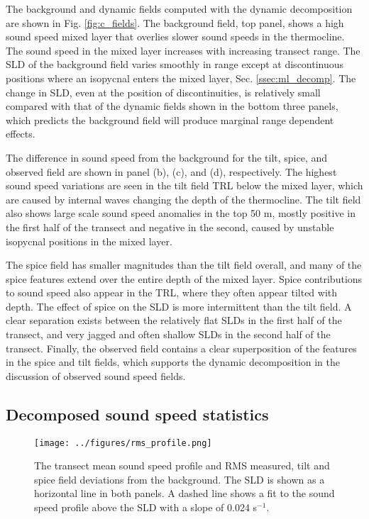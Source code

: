 \documentclass[preprint,NumberedRefs]{JASA}
\begin{document}
The background and dynamic fields computed with the dynamic decomposition are shown in Fig. \ref{fig:c_fields}. The background field, top panel, shows a high sound speed mixed layer that overlies slower sound speeds in the thermocline. The sound speed in the mixed layer increases with increasing transect range. The SLD of the background field varies smoothly in range except at discontinuous positions where an isopycnal enters the mixed layer, Sec. \ref{ssec:ml_decomp}. The change in SLD, even at the position of discontinuities, is relatively small compared with that of the dynamic fields shown in the bottom three panels, which predicts the background field will produce marginal range dependent effects.

The difference in sound speed from the background for the tilt, spice, and observed field are shown in panel (b), (c), and (d), respectively. The highest sound speed variations are seen in the tilt field TRL below the mixed layer, which are caused by internal waves changing the depth of the thermocline\cite{colosi21}. The tilt field also shows large scale sound speed anomalies in the top 50 m, mostly positive in the first half of the transect and negative in the second, caused by unstable isopycnal positions in the mixed layer.

The spice field has smaller magnitudes than the tilt field overall, and many of the spice features extend over the entire depth of the mixed layer. Spice contributions to sound speed also appear in the TRL, where they often appear tilted with depth. The effect of spice on the SLD is more intermittent than the tilt field. A clear separation exists between the relatively flat SLDs in the first half of the transect, and very jagged and often shallow SLDs in the second half of the transect. Finally, the observed field contains a clear superposition of the features in the spice and tilt fields, which supports the dynamic decomposition in the discussion of observed sound speed fields.

\subsection{Decomposed sound speed statistics}
\begin{figure}
\texttt{[image: ../figures/rms\_profile.png]}
        \caption{\label{fig:c_rms}{The transect mean sound speed profile and RMS measured, tilt and spice field deviations from the background. The SLD is shown as a horizontal line in both panels. A dashed line shows a fit to the sound speed profile above the SLD with a slope of 0.024 s$^{-1}$.}}
\end{figure}
\end{document}

